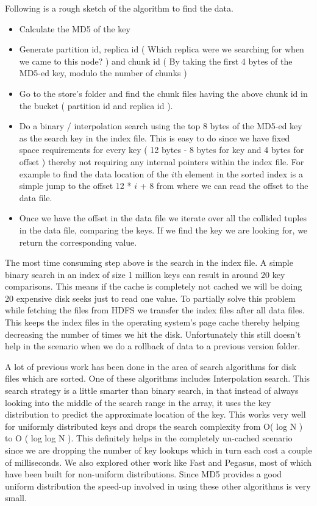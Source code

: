 \documentclass[10pt,twocolumn,preprint,natbib,authoryear]{sigplanconf}
\begin{document}
Following is a rough sketch of the algorithm to find the data. 

\begin{itemize}
	\item Calculate the MD5 of the key
	\item Generate partition id, replica id ( Which replica were we searching for when we came to this node? ) and chunk id ( By taking the first 4 bytes of the MD5-ed key, modulo the number of chunks )
	\item Go to the store's folder and find the chunk files having the above chunk id in the bucket ( partition id and replica id ). 
	\item Do a binary / interpolation search using the top 8 bytes of the MD5-ed key as the search key in the index file. This is easy to do since we have fixed space requirements for every key ( 12 bytes - 8 bytes for key and 4 bytes for offset ) thereby not requiring any internal pointers within the index file. For example to find the data location of the $i$th element in the sorted index is a simple jump to the offset 12 * $i$ + 8 from where we can read the offset to the data file.  
	\item Once we have the offset in the data file we iterate over all the collided tuples in the data file, comparing the keys. If we find the key we are looking for, we return the corresponding value.
\end{itemize}

The most time consuming step above is the search in the index file. A simple binary search in an index of size 1 million keys can result in around 20 key comparisons. This means if the cache is completely not cached we will be doing 20 expensive disk seeks just to read one value. To partially solve this problem while fetching the files from HDFS we transfer the index files after all data files. This keeps the index files in the operating system's page cache thereby helping decreasing the number of times we hit the disk. Unfortunately this still doesn't help in the scenario when we do a rollback of data to a previous version folder. 

A lot of previous work has been done in the area of search algorithms for disk files which are sorted. One of these algorithms includes Interpolation search\cite{An adaptation of a root finding method to searching ordered disk files}. This search strategy is a little smarter than binary search, in that instead of always looking into the middle of the search range in the array, it uses the key distribution to predict the approximate location of the key. This works very well for uniformly distributed keys and drops the search complexity from O( log N ) to O ( log log N ). This definitely helps in the completely un-cached scenario since we are dropping the number of key lookups which in turn each cost a couple of milliseconds. We also explored other work like Fast and Pegasus, most of which have been built for non-uniform distributions. Since MD5 provides a good uniform distribution the speed-up involved in using these other algorithms is very small. 
\end{document}
